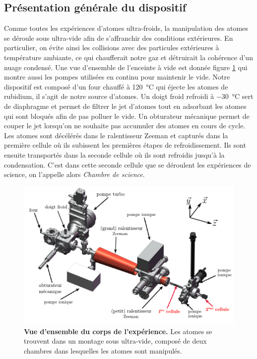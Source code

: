 \subsection{Présentation générale du dispositif}
Comme toutes les expériences d'atomes ultra-froids, la manipulation des atomes se déroule sous ultra-vide afin de s'affranchir des conditions extérieures. En particulier, on évite ainsi les collisions avec des particules extérieures à température ambiante, ce qui chaufferait notre gaz et détruirait la cohérence d'un nuage condensé. Une vue d'ensemble de l'enceinte à vide est donnée figure \ref{fig:manip} qui montre aussi les pompes utilisées en continu pour maintenir le vide. Notre dispositif est composé d'un four chauffé à \SI{120}{\degreeCelsius} qui éjecte les atomes de rubidium, il s'agit de notre source d'atomes. Un doigt froid refroidi à \SI{-30}{\degreeCelsius} sert de diaphragme et permet de filtrer le jet d'atomes tout en adsorbant les atomes qui sont bloqués afin de pas polluer le vide. Un obturateur mécanique permet de couper le jet lorsqu'on ne souhaite pas accumuler des atomes en cours de cycle. Les atomes sont décélérés dans le ralentisseur Zeeman et capturés dans la première cellule où ils subissent les premières étapes de refroidissement. Ils sont ensuite transportés dans la seconde cellule où ils sont refroidis jusqu'à la condensation. C'est dans cette seconde cellule que se déroulent les expériences de science, on l'appelle alors \emph{Chambre de science}.

\begin{figure}
\centering
\includegraphics[width=\textwidth]{Fig/BEC_manip/manip.pdf}
\caption{\textbf{Vue d'ensemble du corps de l'expérience.} Les atomes se trouvent dans un montage sous ultra-vide, composé de deux chambres dans lesquelles les atomes sont manipulés.}
\label{fig:manip}
\end{figure}


